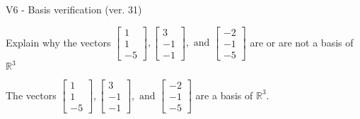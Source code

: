 \begin{exercise}
  \begin{exerciseTitle}V6 - Basis verification (ver. 31)\end{exerciseTitle}
  \begin{exerciseStatement}
    Explain why the vectors \(\left[\begin{array}{r}
1 \\
1 \\
-5
\end{array}\right] , \left[\begin{array}{r}
3 \\
-1 \\
-1
\end{array}\right] , \text{ and } \left[\begin{array}{r}
-2 \\
-1 \\
-5
\end{array}\right]\) are or are not a basis of \(\mathbb{R}^3\)	


  \end{exerciseStatement}
  \begin{exerciseAnswer}
   The vectors \(\left[\begin{array}{r}
1 \\
1 \\
-5
\end{array}\right] , \left[\begin{array}{r}
3 \\
-1 \\
-1
\end{array}\right] , \text{ and } \left[\begin{array}{r}
-2 \\
-1 \\
-5
\end{array}\right]\) 
  	 are  a basis of \(\mathbb{R}^3\).
  


  \end{exerciseAnswer}
\end{exercise}